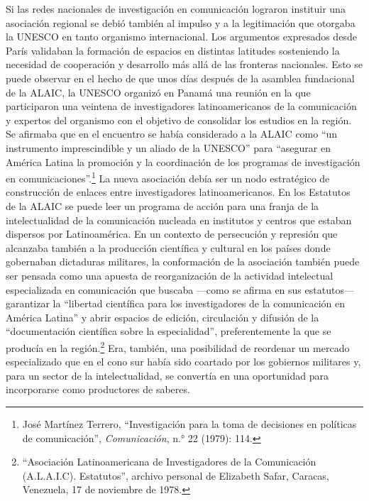 \documentclass{tufte-handout}
\begin{document}
Si las redes nacionales de investigación en comunicación lograron
instituir una asociación regional se debió también al impulso y a la
legitimación que otorgaba la UNESCO en tanto organismo internacional.
Los argumentos expresados desde París validaban la formación de espacios
en distintas latitudes sosteniendo la necesidad de cooperación y
desarrollo más allá de las fronteras nacionales. Esto se puede observar
en el hecho de que unos días después de la asamblea fundacional de la
ALAIC, la UNESCO organizó en Panamá una reunión en la que participaron
una veintena de investigadores latinoamericanos de la comunicación y
expertos del organismo con el objetivo de consolidar los estudios en la
región. Se afirmaba que en el encuentro se había considerado a la ALAIC
como ``un instrumento imprescindible y un aliado de la UNESCO'' para
``asegurar en América Latina la promoción y la coordinación de los
programas de investigación en comunicaciones''.\footnote{José Martínez
  Terrero, ``Investigación para la toma de decisiones en políticas de
  comunicación'', \emph{Comunicación}, n.° 22 (1979): 114.} La nueva
asociación debía ser un nodo estratégico de construcción de enlaces
entre investigadores latinoamericanos. En los Estatutos de la ALAIC se
puede leer un programa de acción para una franja de la intelectualidad
de la comunicación nucleada en institutos y centros que estaban
dispersos por Latinoamérica. En un contexto de persecución y represión
que alcanzaba también a la producción científica y cultural en los
países donde gobernaban dictaduras militares, la conformación de la
asociación también puede ser pensada como una apuesta de reorganización
de la actividad intelectual especializada en comunicación que buscaba
---como se afirma en sus estatutos--- garantizar la ``libertad
científica para los investigadores de la comunicación en América
Latina'' y abrir espacios de edición, circulación y difusión de la
``documentación científica sobre la especialidad'', preferentemente la
que se producía en la región.\footnote{``Asociación Latinoamericana de
  Investigadores de la Comunicación (A.L.A.I.C). Estatutos'', archivo
  personal de Elizabeth Safar, Caracas, Venezuela, 17 de noviembre de
  1978.} Era, también, una posibilidad de reordenar un mercado
especializado que en el cono sur había sido coartado por los gobiernos
militares y, para un sector de la intelectualidad, se convertía en una
oportunidad para incorporarse como productores de saberes.
\end{document}
